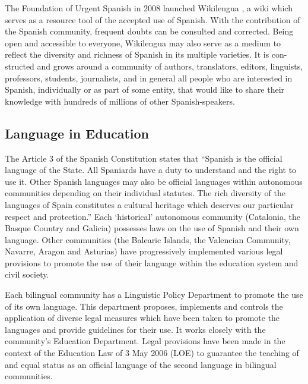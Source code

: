 \begin{multicols}{2}
The Foundation of Urgent Spanish in 2008 launched Wikilengua \cite{wikilengua}, a wiki which serves as a resource tool of the accepted use of Spanish. With the contribution of the Spanish community, frequent doubts can be consulted and corrected. Being open and accessible to everyone, Wikilengua may also serve as a medium to reflect the diversity and richness of Spanish in its multiple varieties. It is con-structed and grows around a community of authors, translators, editors, linguists, professors, students, journalists, and in general all people who are interested in Spanish, individually or as part of some entity, that would like to share their knowledge with hundreds of millions of other Spanish-speakers.

\subsection{Language in Education}


The Article 3 of the Spanish Constitution states that “Spanish is the official language of the State. All Spaniards have a duty to understand and the right to use it. Other Spanish languages may also be official languages within autonomous communities depending on their individual statutes. The rich diversity of the languages of Spain constitutes a cultural heritage which deserves our particular respect and protection.” Each ‘historical’ autonomous community (Catalonia, the Basque Country and Galicia) possesses laws on the use of Spanish and their own language. Other communities (the Balearic Islands, the Valencian Community, Navarre, Aragon and Asturias) have progressively implemented various legal provisions to promote the use of their language within the education system and civil society.


Each bilingual community has a Linguistic Policy Department to promote the use of its own language. This department proposes, implements and controls the application of diverse legal measures which have been taken to promote the languages and provide guidelines for their use. It works closely with the community’s Education Department. Legal provisions have been made in the context of the Education Law of 3 May 2006 (LOE) to guarantee the teaching of and equal status as an official language of the second language in bilingual communities.


\end{multicols}
